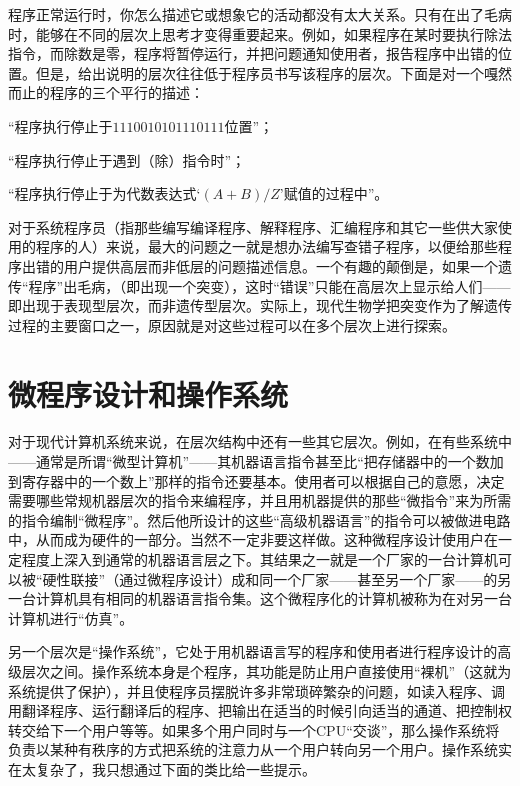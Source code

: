 程序正常运行时，你怎么描述它或想象它的活动都没有太大关系。只有在出了毛病时，能够在不同的层次上思考才变得重要起来。例如，如果程序在某时要执行除法指令，而除数是零，程序将暂停运行，并把问题通知使用者，报告程序中出错的位置。但是，给出说明的层次往往低于程序员书写该程序的层次。下面是对一个嘎然而止的程序的三个平行的描述：

\begin{description}[style=nextline,format=\sffamily\itemcolon,
  labelindent=\parindent,leftmargin=2\parindent,itemindent=!]
\item[机器语言层]“程序执行停止于$1110010101110111$位置”；
\item[汇编语言层]“程序执行停止于遇到（除）指令时”；
\item[编译语言层]“程序执行停止于为代数表达式‘$(A+B)/Z$’赋值的过程中”。
\end{description}

对于系统程序员（指那些编写编译程序、解释程序、汇编程序和其它一些供大家使用的程序的人）来说，最大的问题之一就是想办法编写查错子程序，以便给那些程序出错的用户提供高层而非低层的问题描述信息。一个有趣的颠倒是，如果一个遗传“程序”出毛病，（即出现一个突变），这时“错误”只能在高层次上显示给人们——即出现于表现型层次，而非遗传型层次。实际上，现代生物学把突变作为了解遗传过程的主要窗口之一，原因就是对这些过程可以在多个层次上进行探索。

\section{微程序设计和操作系统}

对于现代计算机系统来说，在层次结构中还有一些其它层次。例如，在有些系统中——通常是所谓“微型计算机”——其机器语言指令甚至比“把存储器中的一个数加到寄存器中的一个数上”那样的指令还要基本。使用者可以根据自己的意愿，决定需要哪些常规机器层次的指令来编程序，并且用机器提供的那些“微指令”来为所需的指令编制“微程序”。然后他所设计的这些“高级机器语言”的指令可以被做进电路中，从而成为硬件的一部分。当然不一定非要这样做。这种微程序设计使用户在一定程度上深入到通常的机器语言层之下。其结果之一就是一个厂家的一台计算机可以被“硬性联接”（通过微程序设计）成和同一个厂家——甚至另一个厂家——的另一台计算机具有相同的机器语言指令集。这个微程序化的计算机被称为在对另一台计算机进行“仿真”。

另一个层次是“操作系统”，它处于用机器语言写的程序和使用者进行程序设计的高级层次之间。操作系统本身是个程序，其功能是防止用户直接使用“裸机”（这就为系统提供了保护），并且使程序员摆脱许多非常琐碎繁杂的问题，如读入程序、调用翻译程序、运行翻译后的程序、把输出在适当的时候引向适当的通道、把控制权转交给下一个用户等等。如果多个用户同时与一个CPU“交谈”，那么操作系统将负责以某种有秩序的方式把系统的注意力从一个用户转向另一个用户。操作系统实在太复杂了，我只想通过下面的类比给一些提示。


